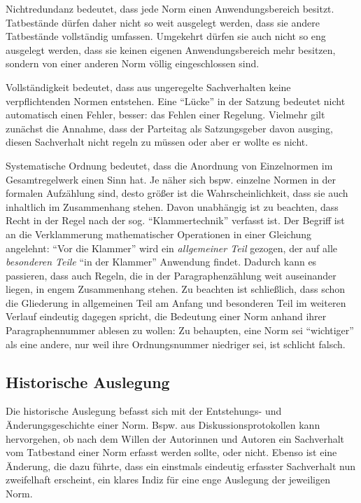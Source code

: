 Nichtredundanz bedeutet, dass jede Norm einen Anwendungsbereich besitzt. Tatbestände dürfen daher nicht so weit ausgelegt werden, dass sie andere Tatbestände vollständig umfassen. Umgekehrt dürfen sie auch nicht so eng ausgelegt werden, dass sie keinen eigenen Anwendungsbereich mehr besitzen, sondern von einer anderen Norm völlig eingeschlossen sind.

Vollständigkeit bedeutet, dass aus ungeregelte Sachverhalten keine verpflichtenden Normen entstehen. Eine \enquote{Lücke} in der Satzung bedeutet nicht automatisch einen Fehler, besser: das Fehlen einer Regelung. Vielmehr gilt zunächst die Annahme, dass der Parteitag als Satzungsgeber davon ausging, diesen Sachverhalt nicht regeln zu müssen oder aber er wollte es nicht.

Systematische Ordnung bedeutet, dass die Anordnung von Einzelnormen im Gesamtregelwerk einen Sinn hat. Je näher sich bspw. einzelne Normen in der formalen Aufzählung sind, desto größer ist die Wahrscheinlichkeit, dass sie auch inhaltlich im Zusammenhang stehen. Davon unabhängig ist zu beachten, dass Recht in der Regel nach der sog. \enquote{Klammertechnik} verfasst ist. Der Begriff ist an die Verklammerung mathematischer Operationen in einer Gleichung angelehnt: \enquote{Vor die Klammer} wird ein \emph{allgemeiner Teil} gezogen, der auf alle \emph{besonderen Teile} \enquote{in der Klammer} Anwendung findet. Dadurch kann es passieren, dass auch Regeln, die in der Paragraphenzählung weit auseinander liegen, in engem Zusammenhang stehen. Zu beachten ist schließlich, dass schon die Gliederung in allgemeinen Teil am Anfang und besonderen Teil im weiteren Verlauf eindeutig dagegen spricht, die Bedeutung einer Norm anhand ihrer Paragraphennummer ablesen zu wollen: Zu behaupten, eine Norm sei \enquote{wichtiger} als eine andere, nur weil ihre Ordnungsnummer niedriger sei, ist schlicht falsch. 

\subsection{Historische Auslegung}
Die historische Auslegung befasst sich mit der Entstehungs- und Änderungsgeschichte einer Norm. Bspw. aus Diskussionsprotokollen kann hervorgehen, ob nach dem Willen der Autorinnen und Autoren ein Sachverhalt vom Tatbestand einer Norm erfasst werden sollte, oder nicht. Ebenso ist eine Änderung, die dazu führte, dass ein einstmals eindeutig erfasster Sachverhalt nun zweifelhaft erscheint, ein klares Indiz für eine enge Auslegung der jeweiligen Norm.

